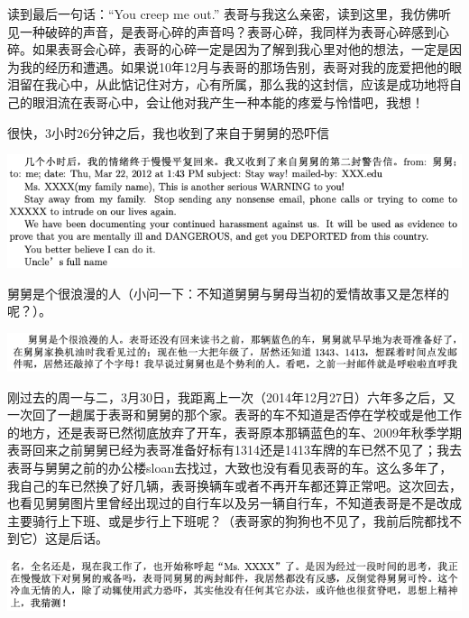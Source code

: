 \documentclass[9pt, b5paper]{article}
\begin{document}
读到最后一句话：“You creep me out.” 表哥与我这么亲密，读到这里，我仿佛听见一种破碎的声音，是表哥心碎的声音吗？表哥心碎，我同样为表哥心碎感到心碎。如果表哥会心碎，表哥的心碎一定是因为了解到我心里对他的想法，一定是因为我的经历和遭遇。如果说10年12月与表哥的那场告别，表哥对我的庞爱把他的眼泪留在我心中，从此惦记住对方，心有所属，那么我的这封信，应该是成功地将自己的眼泪流在表哥心中，会让他对我产生一种本能的疼爱与怜惜吧，我想！

很快，3小时26分钟之后，我也收到了来自于舅舅的恐吓信

\begin{center}
\includegraphics[width=.9\linewidth]{./pic/p1p117-2.png}
\end{center}

舅舅是个很浪漫的人（小问一下：不知道舅舅与舅母当初的爱情故事又是怎样的呢？）。 

\begin{center}
\includegraphics[width=.9\linewidth]{./pic/p1p117-1.png}
\end{center}

刚过去的周一与二，3月30日，我距离上一次（2014年12月27日）六年多之后，又一次回了一趟属于表哥和舅舅的那个家。表哥的车不知道是否停在学校或是他工作的地方，还是表哥已然彻底放弃了开车，表哥原本那辆蓝色的车、2009年秋季学期表哥回来之前舅舅已经为表哥准备好标有1314还是1413车牌的车已然不见了；我去表哥与舅舅之前的办公楼sloan去找过，大致也没有看见表哥的车。这么多年了，我自己的车已然换了好几辆，表哥换辆车或者不再开车都还算正常吧。这次回去，也看见舅舅图片里曾经出现过的自行车以及另一辆自行车，不知道表哥是不是改成主要骑行上下班、或是步行上下班呢？（表哥家的狗狗也不见了，我前后院都找不到它）这是后话。 

\begin{center}
\includegraphics[width=.9\linewidth]{./pic/p1p117-3.png}
\end{center}
\end{document}
